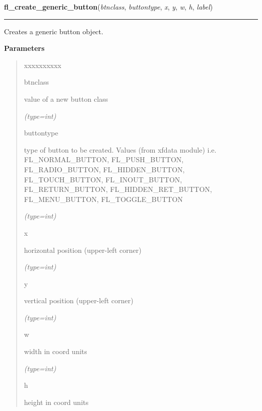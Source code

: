 \hspace{.8\funcindent}\begin{boxedminipage}{\funcwidth}

    \raggedright \textbf{fl\_create\_generic\_button}(\textit{btnclass}, \textit{buttontype}, \textit{x}, \textit{y}, \textit{w}, \textit{h}, \textit{label})

    \vspace{-1.5ex}

    \rule{\textwidth}{0.5\fboxrule}
\setlength{\parskip}{2ex}
    Creates a generic button object.

\setlength{\parskip}{1ex}
      \textbf{Parameters}
      \vspace{-1ex}

      \begin{quote}
        \begin{Ventry}{xxxxxxxxxx}

          \item[btnclass]

          value of a new button class

            {\it (type=int)}

          \item[buttontype]

          type of button to be created. Values (from xfdata module) i.e. 
          FL\_NORMAL\_BUTTON, FL\_PUSH\_BUTTON, FL\_RADIO\_BUTTON, 
          FL\_HIDDEN\_BUTTON, FL\_TOUCH\_BUTTON, FL\_INOUT\_BUTTON, 
          FL\_RETURN\_BUTTON, FL\_HIDDEN\_RET\_BUTTON, FL\_MENU\_BUTTON, 
          FL\_TOGGLE\_BUTTON

            {\it (type=int)}

          \item[x]

          horizontal position (upper-left corner)

            {\it (type=int)}

          \item[y]

          vertical position (upper-left corner)

            {\it (type=int)}

          \item[w]

          width in coord units

            {\it (type=int)}

          \item[h]

          height in coord units


\end{Ventry}
\end{quote}
\end{boxedminipage}
